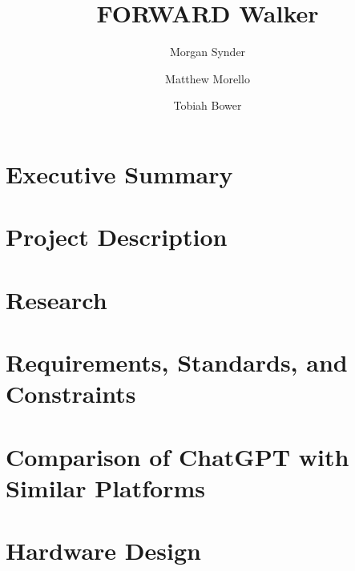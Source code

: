 \documentclass[12pt, letterpaper]{article}
\title{FORWARD Walker}
\author{Morgan Synder \and Matthew Morello \and Tobiah Bower}
\begin{document}
	

	\tableofcontents
	\setcounter{secnumdepth}{2}

	\newpage
	\section{Executive Summary}
	
	
	\section{Project Description}
	
	
	
	
	
	
	\section{Research}
	
	
	
	
	
	
	\section{Requirements, Standards, and Constraints}
	
	
	
	
	
	
	

	\section{Comparison of ChatGPT with Similar Platforms}
	
	\section{Hardware Design}
	
\end{document}
